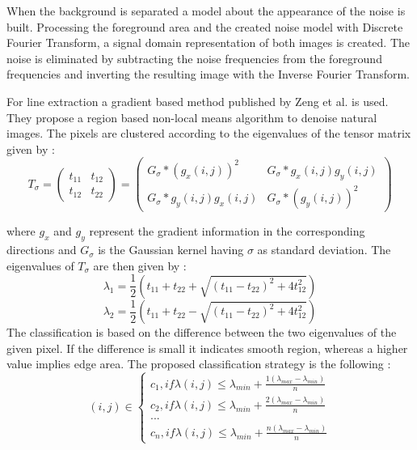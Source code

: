 \documentclass[draft,final]{vutinfth} %
\begin{document}
When the background is separated a model about the appearance of the noise is built.
Processing the foreground area and the created noise model with Discrete Fourier Transform, a signal domain representation  of both images is created.
The noise is eliminated by subtracting the noise frequencies from the foreground frequencies and inverting the resulting image with the Inverse Fourier Transform.
\par
For line extraction a gradient based method published by Zeng et al. \cite{zeng2011region} is used.
They propose a region based non-local means algorithm to denoise natural images.
The pixels are clustered according to the eigenvalues of the tensor matrix given by \cite{zeng2011region}:
\[T_\sigma = 
\begin{pmatrix}
t_{11} & t_{12} \\
t_{12} & t_{22}
\end{pmatrix}
=
\begin{pmatrix}
G_\sigma*(g_x(i,j))^2 & G_{\sigma}*g_x(i, j)g_y(i, j)\\
G_{\sigma}*g_y(i, j)g_x(i, j) & G_{\sigma}*(g_y(i, j))^2
\end{pmatrix}
\]

where $g_x$ and $g_y$ represent the gradient information in the corresponding directions and $G_\sigma$ is the Gaussian kernel having $\sigma$ as standard deviation.
The eigenvalues of $T_\sigma$ are then given by \cite{zeng2011region}:
\[\lambda_1 = \frac{1}{2}(t_{11} + t_{22} + \sqrt{(t_{11}-t_{22})^2 + 4t_{12}^2})\]  
\[\lambda_2 = \frac{1}{2}(t_{11} + t_{22} - \sqrt{(t_{11}-t_{22})^2 + 4t_{12}^2})\]  
\label{eig}
The classification is based on the difference between the two eigenvalues of the given pixel.
If the difference is small it indicates smooth region, whereas a higher value implies edge area.
The proposed classification strategy is the following \cite{zeng2011region}:
\[
(i, j)\in \left\{
                \begin{array}{ll}
                  c_1, if \lambda(i,j) \leq \lambda_{min} + \frac{1(\lambda_{max} - \lambda_{min})}{n}\\
                  c_2, if \lambda(i,j) \leq \lambda_{min} + \frac{2(\lambda_{max} - \lambda_{min})}{n}\\
				... \\
                   c_n, if \lambda(i,j) \leq \lambda_{min} + \frac{n(\lambda_{max} - \lambda_{min})}{n}
                \end{array}
              \right.
\]
\end{document}
